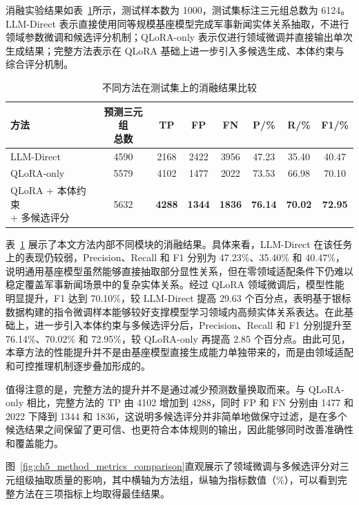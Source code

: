 消融实验结果如表~\ref{tab:ch5_main_results}所示，测试样本数为 1000，测试集标注三元组总数为 6124。LLM-Direct 表示直接使用同等规模基座模型完成军事新闻实体关系抽取，不进行领域参数微调和候选评分机制；QLoRA-only 表示仅进行领域微调并直接输出单次生成结果；完整方法表示在 QLoRA 基础上进一步引入多候选生成、本体约束与综合评分机制。

\begin{table}[htbp]
  \centering
  \caption{不同方法在测试集上的消融结果比较}
  \label{tab:ch5_main_results}
  {\renewcommand{\arraystretch}{1.15}
  \small
  \setlength{\tabcolsep}{5pt}
  \begin{tabular}{@{}lccccccc@{}}
    \toprule
    方法 & \shortstack[c]{预测三元组\\总数} & TP & FP & FN & P/\% & R/\% & F1/\% \\
    \midrule
    LLM-Direct & 4590 & 2168 & 2422 & 3956 & 47.23 & 35.40 & 40.47 \\
    QLoRA-only & 5579 & 4102 & 1477 & 2022 & 73.53 & 66.98 & 70.10 \\
    \shortstack[l]{QLoRA + 本体约束\\+ 多候选评分} & 5632 & \textbf{4288} & \textbf{1344} & \textbf{1836} & \textbf{76.14} & \textbf{70.02} & \textbf{72.95} \\
    \bottomrule
  \end{tabular}}
\end{table}

表~\ref{tab:ch5_main_results} 展示了本文方法内部不同模块的消融结果。具体来看，LLM-Direct 在该任务上的表现仍较弱，Precision、Recall 和 F1 分别为 47.23\%、35.40\% 和 40.47\%，说明通用基座模型虽然能够直接抽取部分显性关系，但在零领域适配条件下仍难以稳定覆盖军事新闻场景中的复杂实体关系。经过 QLoRA 领域微调后，模型性能明显提升，F1 达到 70.10\%，较 LLM-Direct 提高 29.63 个百分点，表明基于银标数据构建的指令微调样本能够较好支撑模型学习领域内高频实体关系表达。在此基础上，进一步引入本体约束与多候选评分后，Precision、Recall 和 F1 分别提升至 76.14\%、70.02\% 和 72.95\%，较 QLoRA-only 再提高 2.85 个百分点。由此可见，本章方法的性能提升并不是由基座模型直接生成能力单独带来的，而是由领域适配和可控推理机制逐步叠加形成的。

值得注意的是，完整方法的提升并不是通过减少预测数量换取而来。与 QLoRA-only 相比，完整方法的 TP 由 4102 增加到 4288，同时 FP 和 FN 分别由 1477 和 2022 下降到 1344 和 1836，这说明多候选评分并非简单地做保守过滤，是在多个候选结果之间保留了更可信、也更符合本体规则的输出，因此能够同时改善准确性和覆盖能力。

图~\ref{fig:ch5_method_metrics_comparison}直观展示了领域微调与多候选评分对三元组级抽取质量的影响，其中横轴为方法组，纵轴为指标数值（\%），可以看到完整方法在三项指标上均取得最佳结果。

